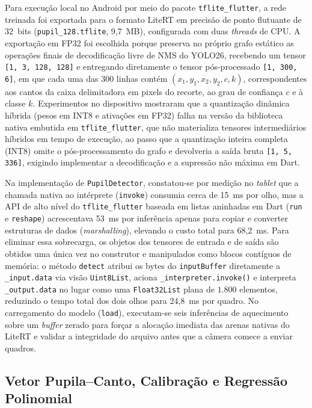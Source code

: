 Para execução local no Android por meio do pacote \texttt{tflite\_flutter}, a rede treinada foi exportada para o formato LiteRT em precisão de ponto flutuante de 32~bits (\texttt{pupil\_128.tflite}, 9,7~MB), configurada com duas \textit{threads} de CPU. A exportação em FP32 foi escolhida porque preserva no próprio grafo estático as operações finais de decodificação livre de NMS do YOLO26, recebendo um tensor \texttt{[1, 3, 128, 128]} e entregando diretamente o tensor pós-processado \texttt{[1, 300, 6]}, em que cada uma das 300 linhas contém $(x_1, y_1, x_2, y_2, c, k)$, correspondentes aos cantos da caixa delimitadora em pixels do recorte, ao grau de confiança $c$ e à classe $k$. Experimentos no dispositivo mostraram que a quantização dinâmica híbrida (pesos em INT8 e ativações em FP32) falha na versão da biblioteca nativa embutida em \texttt{tflite\_flutter}, que não materializa tensores intermediários híbridos em tempo de execução, ao passo que a quantização inteira completa (INT8) omite o pós-processamento do grafo e devolveria a saída bruta \texttt{[1, 5, 336]}, exigindo implementar a decodificação e a supressão não máxima em Dart.

Na implementação de \texttt{PupilDetector}, constatou-se por medição no \textit{tablet} que a chamada nativa ao intérprete (\texttt{invoke}) consumia cerca de 15~ms por olho, mas a API de alto nível do \texttt{tflite\_flutter} baseada em listas aninhadas em Dart (\texttt{run} e \texttt{reshape}) acrescentava 53~ms por inferência apenas para copiar e converter estruturas de dados (\textit{marshalling}), elevando o custo total para 68,2~ms. Para eliminar essa sobrecarga, os objetos dos tensores de entrada e de saída são obtidos uma única vez no construtor e manipulados como blocos contíguos de memória: o método \texttt{detect} atribui os bytes do \texttt{inputBuffer} diretamente a \texttt{\_input.data} via visão \texttt{Uint8List}, aciona \texttt{\_interpreter.invoke()} e interpreta \texttt{\_output.data} no lugar como uma \texttt{Float32List} plana de $1.800$ elementos, reduzindo o tempo total dos dois olhos para 24,8~ms por quadro. No carregamento do modelo (\texttt{load}), executam-se seis inferências de aquecimento sobre um \textit{buffer} zerado para forçar a alocação imediata das arenas nativas do LiteRT e validar a integridade do arquivo antes que a câmera comece a enviar quadros.

\subsection{Vetor Pupila--Canto, Calibração e Regressão Polinomial} \label{sec:met_calibracao}

